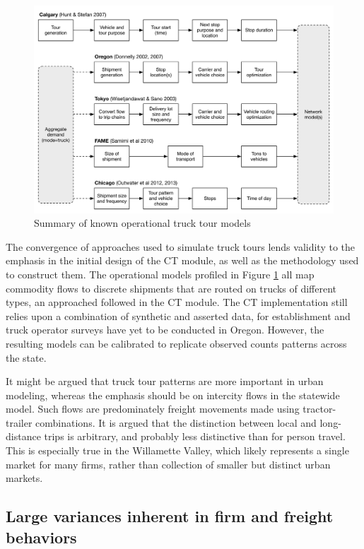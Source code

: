 \begin{figure}[!t]
\centering
\includegraphics[width=6.5in]{figures/truck-tour-models}
\caption{Summary of known operational truck tour models}
\label{fig:ct-truck-tour-models}
\end{figure}

The convergence of approaches used to simulate truck tours lends validity to the emphasis in the initial design of the CT module, as well as the methodology used to construct them. The operational models profiled in Figure \ref{fig:ct-truck-tour-models} all map commodity flows to discrete shipments that are routed on trucks of different types, an approached followed in the CT module. The CT implementation still relies upon a combination of synthetic and asserted data, for establishment and truck operator surveys have yet to be conducted in Oregon. However, the resulting models can be calibrated to replicate observed counts patterns across the state.

It might be argued that truck tour patterns are more important in urban modeling, whereas the emphasis should be on intercity flows in the statewide model. Such flows are predominately freight movements made using tractor-trailer combinations. It is argued that the distinction between local and long-distance trips is arbitrary, and probably less distinctive than for person travel. This is especially true in the Willamette Valley, which likely represents a single market for many firms, rather than collection of smaller but distinct urban markets. 

\subsection{Large variances inherent in firm and freight behaviors}\label{sec:ct-large-variances}

